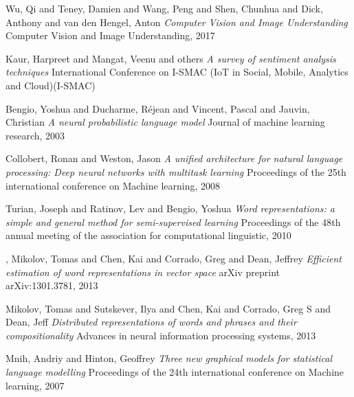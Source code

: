 \begin{thebibliography}{9}
Wu, Qi and Teney, Damien and Wang, Peng and Shen, Chunhua and Dick, Anthony and van den Hengel, Anton\newline
\textit{Computer Vision and Image Understanding}
Computer Vision and Image Understanding, 2017

Kaur, Harpreet and Mangat, Veenu and others\newline
\textit{A survey of sentiment analysis techniques} International Conference on I-SMAC (IoT in Social, Mobile, Analytics and Cloud)(I-SMAC)

Bengio, Yoshua and Ducharme, R{\'e}jean and Vincent, Pascal and Jauvin, Christian\newline
\textit{A neural probabilistic language model}\newline
Journal of machine learning research, 2003

Collobert, Ronan and Weston, Jason\newline
\textit{A unified architecture for natural language processing: Deep neural networks with multitask learning}\newline
Proceedings of the 25th international conference on Machine learning, 2008

Turian, Joseph and Ratinov, Lev and Bengio, Yoshua\newline
\textit{Word representations: a simple and general method for semi-supervised learning}\newline
Proceedings of the 48th annual meeting of the association for computational linguistic, 2010

,
Mikolov, Tomas and Chen, Kai and Corrado, Greg and Dean, Jeffrey\newline
\textit{Efficient estimation of word representations in vector space}\newline
arXiv preprint arXiv:1301.3781, 2013

Mikolov, Tomas and Sutskever, Ilya and Chen, Kai and Corrado, Greg S and Dean, Jeff\newline
\textit{Distributed representations of words and phrases and their compositionality}\newline
Advances in neural information processing systems, 2013

Mnih, Andriy and Hinton, Geoffrey\newline
\textit{Three new graphical models for statistical language modelling}\newline
Proceedings of the 24th international conference on Machine learning, 2007


\end{thebibliography}
